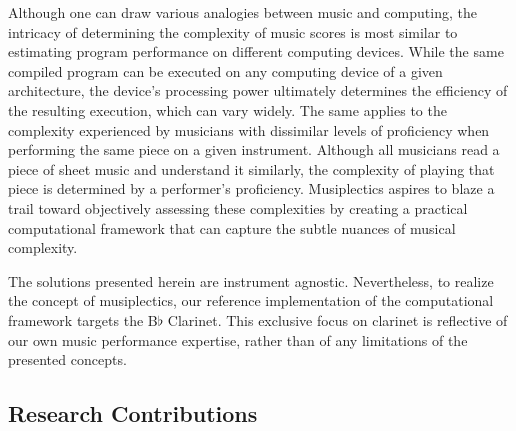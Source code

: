 \documentclass[10pt,preprint]{sigplanconf}
\begin{document}
Although one can draw various analogies between music and computing, the intricacy of determining the complexity of music scores is most similar to estimating program performance on different computing devices. While the same compiled program can be executed on any computing device of a given architecture, the device's processing power ultimately determines the efficiency of the resulting execution, which can vary widely. The same applies to the complexity experienced by musicians with dissimilar levels of proficiency when performing the same piece on a given instrument. Although all musicians read a piece of sheet music and understand it similarly, the complexity of playing that piece is determined by a performer's proficiency. Musiplectics aspires to blaze a trail toward objectively assessing these complexities by creating a practical computational framework that can capture the subtle nuances of musical complexity.

The solutions presented herein are instrument agnostic. Nevertheless, to realize the concept of musiplectics, our reference implementation of the computational framework targets the B$\flat$ Clarinet. This exclusive focus on clarinet is reflective of our own music performance expertise, rather than of any limitations of the presented concepts.


\subsection{Research Contributions} 
\label{sec:rqg}



\end{document}
